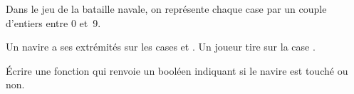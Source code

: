 \question Dans le jeu de la bataille navale, on représente chaque case par un couple d'entiers entre 0 et~9.

Un navire a ses extrémités sur les cases  et . Un joueur tire sur la case . 

\'Ecrire une fonction  qui renvoie un booléen indiquant si le navire est touché ou non.